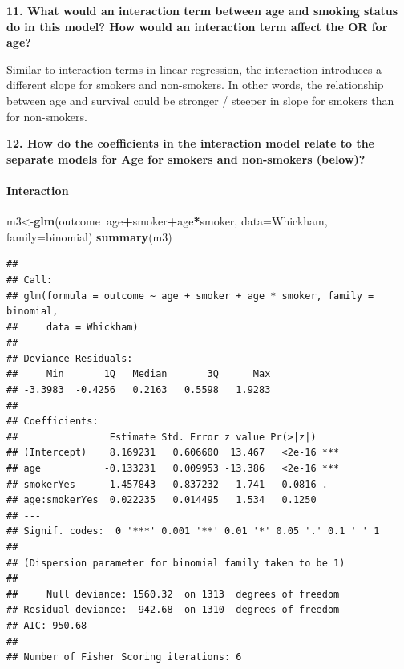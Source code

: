 \documentclass[]{article}
\newenvironment{Shaded}{\begin{snugshade}}{\end{snugshade}}
\newcommand{\DataTypeTok}[1]{\textcolor[rgb]{0.13,0.29,0.53}{#1}}
\newcommand{\KeywordTok}[1]{\textcolor[rgb]{0.13,0.29,0.53}{\textbf{#1}}}
\newcommand{\NormalTok}[1]{#1}
\newcommand{\OperatorTok}[1]{\textcolor[rgb]{0.81,0.36,0.00}{\textbf{#1}}}
\let\oldparagraph\paragraph
\renewcommand{\paragraph}[1]{\oldparagraph{#1}\mbox{}}
\begin{document}
\textbf{11. What would an interaction term between age and smoking
status do in this model? How would an interaction term affect the OR for
age?}

Similar to interaction terms in linear regression, the interaction
introduces a different slope for smokers and non-smokers. In other
words, the relationship between age and survival could be stronger /
steeper in slope for smokers than for non-smokers.

\vspace{0.25in}

\textbf{12. How do the coefficients in the interaction model relate to
the separate models for Age for smokers and non-smokers (below)?}

\hypertarget{interaction}{%
\paragraph{Interaction}\label{interaction}}

\begin{Shaded}
\begin{Highlighting}[]
\NormalTok{m3<-}\KeywordTok{glm}\NormalTok{(outcome}\OperatorTok{~}\NormalTok{age}\OperatorTok{+}\NormalTok{smoker}\OperatorTok{+}\NormalTok{age}\OperatorTok{*}\NormalTok{smoker, }\DataTypeTok{data=}\NormalTok{Whickham, }\DataTypeTok{family=}\NormalTok{binomial)}
\KeywordTok{summary}\NormalTok{(m3)}
\end{Highlighting}
\end{Shaded}

\begin{verbatim}
## 
## Call:
## glm(formula = outcome ~ age + smoker + age * smoker, family = binomial, 
##     data = Whickham)
## 
## Deviance Residuals: 
##     Min       1Q   Median       3Q      Max  
## -3.3983  -0.4256   0.2163   0.5598   1.9283  
## 
## Coefficients:
##                Estimate Std. Error z value Pr(>|z|)    
## (Intercept)    8.169231   0.606600  13.467   <2e-16 ***
## age           -0.133231   0.009953 -13.386   <2e-16 ***
## smokerYes     -1.457843   0.837232  -1.741   0.0816 .  
## age:smokerYes  0.022235   0.014495   1.534   0.1250    
## ---
## Signif. codes:  0 '***' 0.001 '**' 0.01 '*' 0.05 '.' 0.1 ' ' 1
## 
## (Dispersion parameter for binomial family taken to be 1)
## 
##     Null deviance: 1560.32  on 1313  degrees of freedom
## Residual deviance:  942.68  on 1310  degrees of freedom
## AIC: 950.68
## 
## Number of Fisher Scoring iterations: 6
\end{verbatim}
\end{document}
